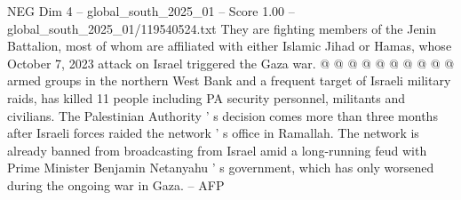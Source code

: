 \begin{textsample}{NEG Dim 4 – global\_south\_2025\_01 – Score 1.00 – global\_south\_2025\_01/119540524.txt}
They are fighting members of the Jenin Battalion, most of whom are affiliated with either Islamic Jihad or Hamas, whose October 7, 2023 attack on Israel triggered the Gaza war. @ @ @ @ @ @ @ @ @ @ armed groups in the northern West Bank and a frequent target of Israeli military raids, has killed 11 people including PA security personnel, militants and civilians.
The Palestinian Authority ' s decision comes more than three months after Israeli forces raided the network ' s office in Ramallah.
The network is already banned from broadcasting from Israel amid a long-running feud with Prime Minister Benjamin Netanyahu ' s government, which has only worsened during the ongoing war in Gaza. -- AFP

\end{textsample}
